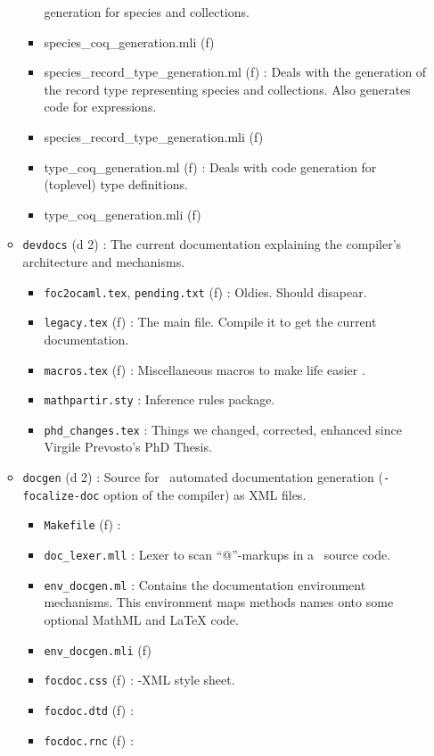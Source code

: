 \begin{itemize}
\begin{itemize}
\begin{itemize}
      generation for species and collections.
    \item {species\_coq\_generation.mli} (f)
    \item {species\_record\_type\_generation.ml} (f) : Deals with the
      generation of the record type representing species and
      collections. Also generates code for expressions.
    \item {species\_record\_type\_generation.mli} (f)
    \item {type\_coq\_generation.ml} (f) : Deals with code generation
      for (toplevel) type definitions.
    \item {type\_coq\_generation.mli} (f)
    \end{itemize}
  \item {\tt devdocs} (d 2) : The current documentation explaining the
    compiler's architecture and mechanisms.
    \begin{itemize}
    \item {\tt foc2ocaml.tex}, {\tt pending.txt} (f) :
      Oldies. Should disapear.
    \item {\tt legacy.tex} (f) : The main \latex file. Compile it to
      get the current documentation.
    \item {\tt macros.tex} (f) : Miscellaneous macros to make life
      easier \smiley.
    \item {\tt mathpartir.sty} : Inference rules package.
    \item {\tt phd\_changes.tex} : Things we changed, corrected,
      enhanced since Virgile Prevosto's PhD Thesis.
    \end{itemize}
  \item {\tt docgen} (d 2) : Source for \focalizec\ automated
    documentation generation ({\tt -focalize-doc} option of the
    compiler) as XML files.
    \begin{itemize}
    \item {\tt Makefile} (f) :
    \item {\tt doc\_lexer.mll} : Lexer to scan ``@''-markups in a
      \focalize\ source code.
    \item {\tt env\_docgen.ml} : Contains the documentation environment
      mechanisms. This environment maps methods names onto some optional MathML
      and LaTeX code.
    \item {\tt env\_docgen.mli} (f)
    \item {\tt focdoc.css} (f) : \focalizedoc-XML style sheet.
    \item {\tt focdoc.dtd} (f) :
    \item {\tt focdoc.rnc} (f) :

\end{itemize}
\end{itemize}
\end{itemize}
